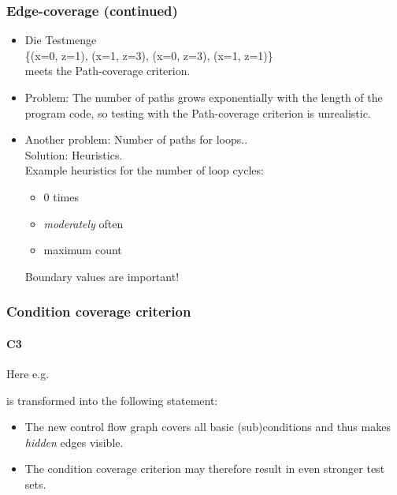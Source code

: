 \begin{frame}
\frametitle{Edge-coverage (continued)}
\begin{itemize}
  \item Die Testmenge\\
   \{(x=0, z=1), (x=1, z=3), (x=0, z=3), (x=1, z=1)\}\\
   meets the Path-coverage criterion.
  \item Problem: The number of paths grows exponentially with the length of the program code, so testing with the Path-coverage criterion is unrealistic.
  \item Another problem: Number of paths for loops..\\
  Solution: Heuristics.\\
   Example heuristics for the number of loop cycles:
    \begin{itemize}
      \item 0 times
      \item \emph{moderately } often 
      \item maximum count
    \end{itemize}
  Boundary values are important!
\end{itemize}
\end{frame}


\begin{frame}
\frametitle{Condition coverage criterion}
\framesubtitle{C3}
Here e.g.\\
\begin{quote}
\texttt{}
\end{quote}
is transformed into the following statement:\\
\begin{quote}
\texttt{}
\end{quote}

\vspace{\baselineskip}
\begin{itemize}
  \item The new control flow graph covers all basic (sub)conditions and thus makes \emph{hidden} edges visible.
  \item The condition coverage criterion may therefore result in even stronger test sets.
\end{itemize}
\end{frame}

